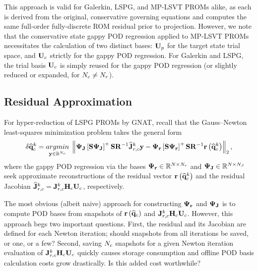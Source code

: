 This approach is valid for Galerkin, LSPG, and MP-LSVT PROMs alike, as each is derived from the original, conservative governing equations and computes the same full-order fully-discrete ROM residual prior to projection. However, we note that the conservative state gappy POD regression applied to MP-LSVT PROMs necessitates the calculation of two distinct bases: $\primTrial$ for the target state trial space, and $\consTrial$ strictly for the gappy POD regression. For Galerkin and LSPG, the trial basis $\consTrial$ is simply reused for the gappy POD regression (or slightly reduced or expanded, for $N_c \neq N_r$).

\subsection{Residual Approximation}
%
For hyper-reduction of LSPG PROMs by GNAT, recall that the Gauss--Newton least-squares minimization problem takes the general form
%
\begin{equation}
    \delta \consVecCoef^{\newtonIdx} = \argmin{\dummyVec \inROne{\numConsModes}} \left\Vert \deimBasisJacob \left[ \sampMat \deimBasisJacob \right]^{+} \sampMat \resScaleInv \jacobResCoefCons^{\newtonIdx} \dummyVec - \deimBasisRes \left[ \sampMat \deimBasisRes \right]^{+} \sampMat \resScaleInv \resFunc{\consVecCoef^{\newtonIdx}} \right\Vert_2,
\end{equation}
%
where the gappy POD regression via the bases $\deimBasisRes \inRTwo{\numDOF}{\numResModes}$ and $\deimBasisJacob \inRTwo{\numDOF}{\numJacobModes}$ seek approximate reconstructions of the residual vector $\mathbf{r}\left(\mathbf{\widehat{q}}_{c}^{k}\right)$ and the residual Jacobian $\jacobResCoefCons^{\newtonIdx} = \jacobResCons^{\newtonIdx} \consScale \consTrial$, respectively.

The most obvious (albeit naive) approach for constructing $\deimBasisRes$ and $\deimBasisJacob$ is to compute POD bases from snapshots of $\mathbf{r}\left(\mathbf{\widehat{q}}_{c}\right)$ and $\jacobResCons^{\newtonIdx} \consScale \consTrial$. However, this approach begs two important questions. First, the residual and its Jacobian are defined for each Newton iteration; should snapshots from all iterations be saved, or one, or a few? Second, saving $N_c$ snapshots for a given Newton iteration evaluation of $\jacobResCons^{\newtonIdx} \consScale \consTrial$ quickly causes storage consumption and offline POD basis calculation costs grow drastically. Is this added cost worthwhile?

